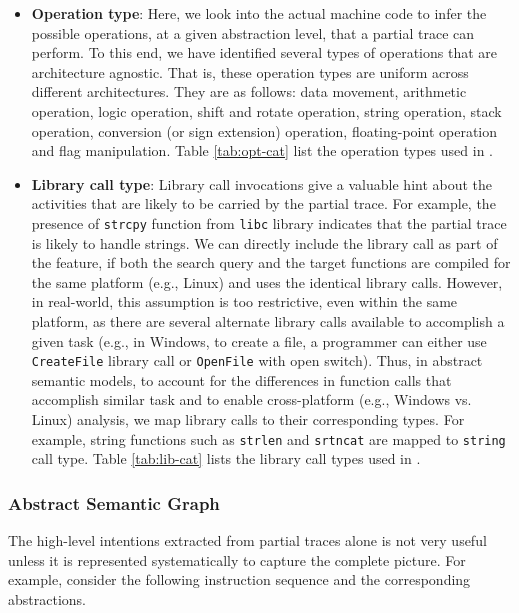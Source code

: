 \begin{itemize}

\item \textbf{Operation type}: Here, we look into the actual machine code to infer the possible operations, at a given abstraction level, that a partial trace can perform. To this end, we have identified several types of operations that are architecture agnostic. That is, these operation types are uniform across different architectures. They are as follows: data movement, arithmetic operation, logic operation, shift and rotate operation, string operation, 
stack operation, conversion (or sign extension) operation, 
floating-point operation 
and flag manipulation. Table \ref{tab:opt-cat} list the operation types used in \tool.

\item \textbf{Library call type}: Library call invocations give a valuable hint about the activities that are likely to be carried by the partial trace. For example, the presence of \texttt{strcpy} function from \texttt{libc} library indicates that the partial trace is likely to handle strings. We can directly include the library call as part of the feature, if both the search query and the target functions are compiled for the same platform (e.g., Linux) and uses the identical library calls. However, in real-world, this assumption is too restrictive, even within the same platform, as there are several alternate library calls available to accomplish a given task  (e.g., in Windows, to create a file, a programmer can either use \texttt{CreateFile} library call or \texttt{OpenFile} with open switch).  Thus, in abstract semantic models, to account for the differences in function calls that accomplish similar task and to enable cross-platform (e.g., Windows vs. Linux) analysis, we map library calls to their corresponding types. For example, string functions such as \texttt{strlen} and \texttt{srtncat} are mapped to \texttt{string} call type. Table \ref{tab:lib-cat} lists the library call types used in \tool.
\end{itemize}

\subsubsection*{Abstract Semantic Graph} 
The high-level intentions extracted from partial traces alone is not very useful unless it is represented systematically to capture the complete picture. For example, consider the following instruction sequence and the corresponding abstractions.

